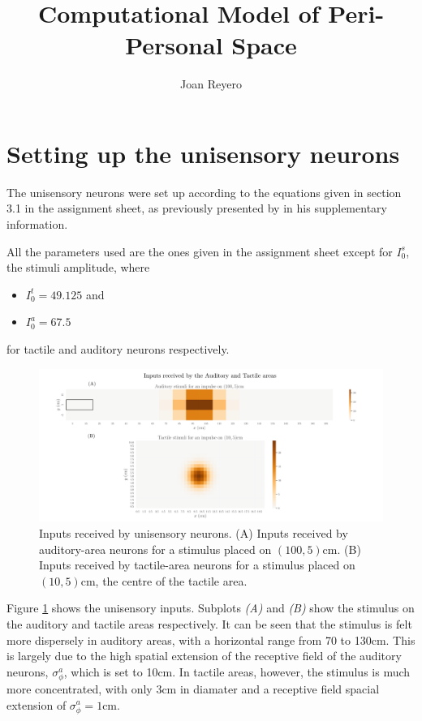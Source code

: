 \documentclass[12pt]{article}
\title{Computational Model of Peri-Personal Space}
\author{Joan Reyero}
\begin{document}
\maketitle

\section{Setting up the unisensory neurons}

The unisensory neurons were set up according to the equations given in section 3.1 in the assignment sheet, as  previously presented by \cite{Serino2015} in his supplementary information.

All the parameters used are the ones given in the assignment sheet except for $I_0^s$, the stimuli amplitude, where
\begin{itemize}
    \item $I_0^t = 49.125$ and
    \item $I_0^a = 67.5$
\end{itemize}
for tactile and auditory neurons respectively. 
\begin{figure}[h!]
	\centering
	\hspace*{-0.6in}
	\includegraphics[width=1.2\linewidth]{fig/3-1.png}
	\caption{Inputs received by unisensory neurons. (A) Inputs received by auditory-area neurons for a stimulus placed on $(100,5)$cm. (B) Inputs received by tactile-area neurons for a stimulus placed on $(10,5)$cm, the centre of the tactile area.}
	\label{fig:3.1}
\end{figure}

Figure \ref{fig:3.1} shows the unisensory inputs. Subplots \textit{(A)} and \textit{(B)} show the stimulus on the auditory and tactile areas respectively. It can be seen that the stimulus is felt more dispersely in auditory areas, with a horizontal range from 70 to 130cm. This is largely due to the high spatial extension of the receptive field of the auditory neurons, $\sigma_\phi^a$, which is set to 10cm. In tactile areas, however, the stimulus is much more concentrated, with only 3cm in diamater and a receptive field spacial extension of $\sigma_\phi^a = 1$cm.
\end{document}
